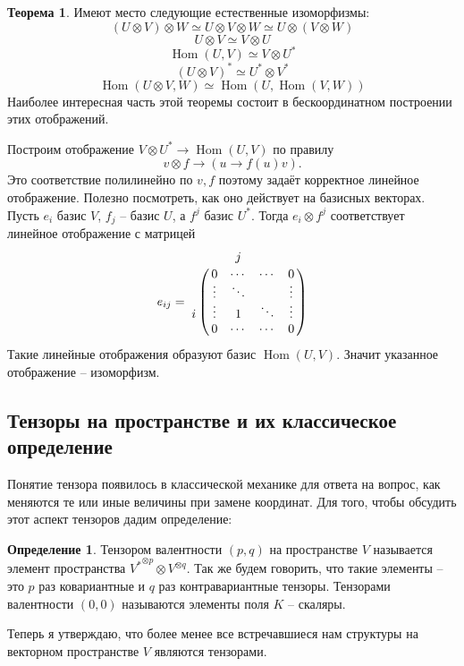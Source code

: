 \documentclass[10pt,a4paper,oneside]{book}
\theoremstyle{definition}
\newtheorem*{defn}{\color{yellow!30!red} Определение}
\newtheorem{thm}{\color{red!40!black}Теорема}
\newcommand{\Hom}{\operatorname{Hom}}
\def\thrm{\begin{thm}}
\def\ethrm{\end{thm}}
\def\dfn{\begin{defn}}
\def\edfn{\end{defn}}
\begin{document}
\thrm Имеют место следующие естественные изоморфизмы: 
$$(U \otimes V) \otimes W \simeq U \otimes V \otimes W \simeq U \otimes (V \otimes W)$$
$$ U \otimes V \simeq V \otimes U $$
$$ \Hom (U,V) \simeq  V \otimes U^*$$
$$(U \otimes V)^{*} \simeq U^{*}\otimes V^{*} $$
$$\Hom (U\otimes V,  W) \simeq \Hom (U, \Hom (V,W))$$
\proof Наиболее интересная часть этой теоремы состоит в бескоординатном построении этих отображений.

Построим отображение $V\otimes U^{*} \to \Hom (U,V)$ по правилу $$v\otimes f \to (u \to f(u)v).$$
Это соответствие полилинейно по $v,f$ поэтому задаёт корректное линейное отображение. Полезно посмотреть, как оно действует на базисных векторах. Пусть $e_i$ базис $V$, $f_j$ -- базис $U$, а $f^j$ базис $U^{*}$. Тогда $e_i\otimes f^j$ соответствует линейное отображение с матрицей 
$$ e_{ij}= \bordermatrix{
 & &j&& \cr
 &0&\cdots&\cdots&0\cr
 &\vdots&\ddots && \vdots\cr
i&\vdots& 1 & \ddots& \vdots\cr
 &0&\cdots& \cdots&0
}$$
Такие линейные отображения образуют базис $\Hom(U,V)$. Значит указанное отображение -- изоморфизм.

\endproof 
\ethrm


\subsection{Тензоры на пространстве и их классическое определение}

Понятие тензора появилось в классической механике для ответа на вопрос, как меняются те или иные величины при замене координат. Для того, чтобы обсудить этот аспект тензоров дадим определение:

\dfn Тензором валентности $(p,q)$ на пространстве $V$ называется элемент пространства ${V^{*}}^{\otimes p} \otimes V^{\otimes q}$. Так же будем говорить, что такие элементы -- это $p$ раз ковариантные и $q$ раз контравариантные тензоры. Тензорами валентности $(0,0)$ называются элементы поля $K$ -- скаляры.
\edfn

Теперь я утверждаю, что более менее все встречавшиеся нам структуры на векторном пространстве $V$ являются тензорами.
\end{document}
